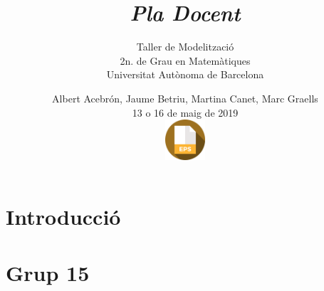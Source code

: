 \documentclass[twocolumn]{beamer}
\begin{document}
\section{Introducció}
\title{\textit{Pla Docent}}
\subtitle{\color{blue!20!black} Taller de Modelització \\ 2n. de Grau en  Matemàtiques \\ \color{black} Universitat Autònoma de Barcelona}
\date{Albert Acebrón, Jaume Betriu, Martina Canet, Marc Graells\\ 13 o 16 de maig de 2019 \\\includegraphics[width=1.5cm]{eps}}
\section{Grup 15}
\end{document}
